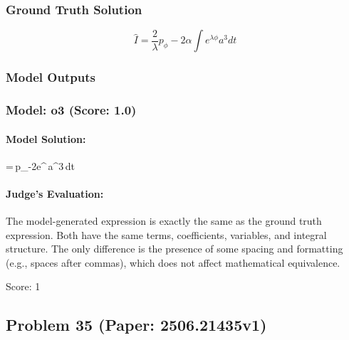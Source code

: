 \documentclass[10pt]{article}
\begin{document}
\subsubsection*{Ground Truth Solution}
\[ \boxed{\hat{I} = \frac{2}{\lambda}p_{\phi} - 2\alpha \int e^{\lambda\phi}a^{3}dt} \]

\subsubsection*{Model Outputs}
\subsubsection*{Model: o3 (Score: 1.0)}
\paragraph*{Model Solution:}
\;
=\,p_{\phi}-2\alpha\int e^{\lambda\phi}\,a^{3}\,dt
\;

\paragraph*{Judge's Evaluation:}

The model-generated expression is exactly the same as the ground truth expression. Both have the same terms, coefficients, variables, and integral structure. The only difference is the presence of some spacing and formatting (e.g., spaces after commas), which does not affect mathematical equivalence.

Score: 1

\newpage
\subsection*{Problem 35 (Paper: 2506.21435v1)}
\end{document}
